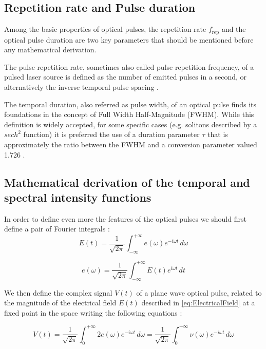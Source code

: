 \subsection{Repetition rate and Pulse duration}
Among the basic properties of optical pulses, the repetition rate $f_{\text{rep}}$ and the optical pulse duration are two key parameters that should be mentioned before any mathematical derivation.

The pulse repetition rate, sometimes also called pulse repetition frequency, of a pulsed laser source is defined as the number of emitted pulses in a second, or alternatively the inverse temporal pulse spacing \cite{RP2005_rep_rate}.

The temporal duration, also referred as pulse width, of an optical pulse finds its foundations in the concept of Full Width Half-Magnitude (FWHM). While this definition is widely accepted, for some specific cases (e.g. solitons described by a $sech^2$ function) it is preferred the use of a duration parameter $\tau$ that is approximately the ratio between the FWHM and a conversion parameter valued 1.726 \cite{RP2005_duration}. 

\subsection{Mathematical derivation of the temporal and spectral intensity functions}
In order to define even more the features of the optical pulses we should first define a pair of Fourier integrals :
\begin{equation}
E(t) = \frac{1}{\sqrt{2\pi}}\int_{-\infty}^{+\infty} e(\omega)e^{-i\omega t}\, d\omega
\label{eq:ElectricalField}
\end{equation}

\begin{equation}
e(\omega) = \frac{1}{\sqrt{2\pi}}\int_{-\infty}^{+\infty} E(t)e^{i\omega t}\, dt
\label{eq:FT_Electrical}
\end{equation}

We then define the complex signal $V(t)$ of a plane wave optical pulse, related to the magnitude of the electrical field $E(t)$ described in \autoref{eq:ElectricalField} at a fixed point in the space writing the following equations :

\begin{equation}
V(t) = \frac{1}{\sqrt{2\pi}}\int_{0}^{+\infty} 2e(\omega)e^{-i\omega t}\, d\omega
= \frac{1}{\sqrt{2\pi}}\int_{0}^{+\infty} \nu(\omega)e^{-i\omega t}\, d\omega
\label{eq:OptPulse1}
\end{equation}

